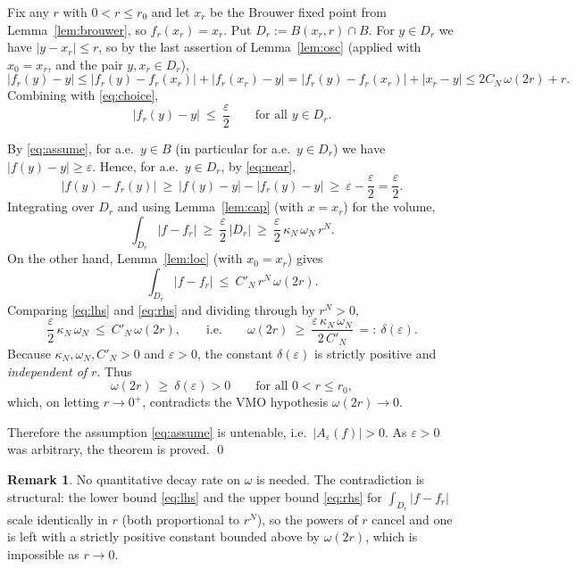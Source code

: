 \documentclass{amsart}
\theoremstyle{definition}
\newtheorem{remark}{Remark}
\begin{document}
Fix any $r$ with $0<r\le r_0$ and let $x_r$ be the Brouwer fixed point from
Lemma~\ref{lem:brouwer}, so $f_r(x_r)=x_r$. Put $D_r:=B(x_r,r)\cap B$. For
$y\in D_r$ we have $|y-x_r|\le r$, so by the last assertion of Lemma~\ref{lem:osc}
(applied with $x_0=x_r$, and the pair $y,x_r\in D_r$),
\[
|f_r(y)-y|\le|f_r(y)-f_r(x_r)|+|f_r(x_r)-y|
=|f_r(y)-f_r(x_r)|+|x_r-y|
\le 2C_N\,\omega(2r)+r .
\]
Combining with \eqref{eq:choice},
\begin{equation}\label{eq:near}
|f_r(y)-y|\ \le\ \frac{\varepsilon}{2}\qquad\text{for all }y\in D_r .
\end{equation}

By \eqref{eq:assume}, for a.e.\ $y\in B$ (in particular for a.e.\ $y\in D_r$) we
have $|f(y)-y|\ge\varepsilon$. Hence, for a.e.\ $y\in D_r$, by \eqref{eq:near},
\[
|f(y)-f_r(y)|\ \ge\ |f(y)-y|-|f_r(y)-y|\ \ge\ \varepsilon-\frac{\varepsilon}{2}
=\frac{\varepsilon}{2} .
\]
Integrating over $D_r$ and using Lemma~\ref{lem:cap} (with $x=x_r$) for the volume,
\begin{equation}\label{eq:lhs}
\int_{D_r}|f-f_r|\ \ge\ \frac{\varepsilon}{2}\,|D_r|
\ \ge\ \frac{\varepsilon}{2}\,\kappa_N\,\omega_N\,r^N .
\end{equation}
On the other hand, Lemma~\ref{lem:loc} (with $x_0=x_r$) gives
\begin{equation}\label{eq:rhs}
\int_{D_r}|f-f_r|\ \le\ C'_N\,r^N\,\omega(2r).
\end{equation}
Comparing \eqref{eq:lhs} and \eqref{eq:rhs} and dividing through by $r^N>0$,
\[
\frac{\varepsilon}{2}\,\kappa_N\,\omega_N\ \le\ C'_N\,\omega(2r),
\qquad\text{i.e.}\qquad
\omega(2r)\ \ge\ \frac{\varepsilon\,\kappa_N\,\omega_N}{2\,C'_N}\ =:\ \delta(\varepsilon).
\]
Because $\kappa_N,\omega_N,C'_N>0$ and $\varepsilon>0$, the constant
$\delta(\varepsilon)$ is strictly positive and \emph{independent of $r$}. Thus
\[
\omega(2r)\ \ge\ \delta(\varepsilon)>0\qquad\text{for all }0<r\le r_0 ,
\]
which, on letting $r\to0^+$, contradicts the VMO hypothesis $\omega(2r)\to0$.

Therefore the assumption \eqref{eq:assume} is untenable, i.e.\
$|A_\varepsilon(f)|>0$. As $\varepsilon>0$ was arbitrary, the theorem is proved.
\qed

\begin{remark}
No quantitative decay rate on $\omega$ is needed. The contradiction is structural:
the lower bound \eqref{eq:lhs} and the upper bound \eqref{eq:rhs} for
$\int_{D_r}|f-f_r|$ scale identically in $r$ (both proportional to $r^N$), so the
powers of $r$ cancel and one is left with a strictly positive constant bounded
above by $\omega(2r)$, which is impossible as $r\to0$.
\end{remark}
\end{document}
